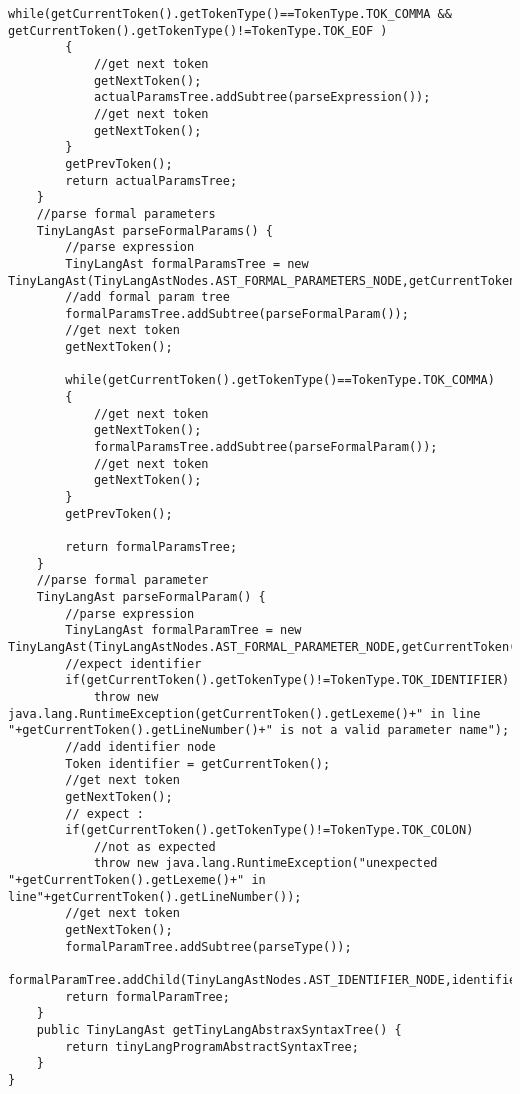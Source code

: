 \begin{lstlisting}[basicstyle=\miniscule,caption=Implementation of recursive descent parser,label=listing:rescursive descent parser implementation]
		while(getCurrentToken().getTokenType()==TokenType.TOK_COMMA && getCurrentToken().getTokenType()!=TokenType.TOK_EOF )
		{
			//get next token
			getNextToken();
			actualParamsTree.addSubtree(parseExpression());
			//get next token
			getNextToken();
		}
		getPrevToken();
		return actualParamsTree;
	}
	//parse formal parameters
	TinyLangAst parseFormalParams() {
		//parse expression
		TinyLangAst formalParamsTree = new TinyLangAst(TinyLangAstNodes.AST_FORMAL_PARAMETERS_NODE,getCurrentToken().getLineNumber());	
		//add formal param tree
		formalParamsTree.addSubtree(parseFormalParam());
		//get next token
		getNextToken();

		while(getCurrentToken().getTokenType()==TokenType.TOK_COMMA)
		{
			//get next token
			getNextToken();
			formalParamsTree.addSubtree(parseFormalParam());
			//get next token
			getNextToken();
		}
		getPrevToken();

		return formalParamsTree;
	}
	//parse formal parameter
	TinyLangAst parseFormalParam() {
		//parse expression
		TinyLangAst formalParamTree = new TinyLangAst(TinyLangAstNodes.AST_FORMAL_PARAMETER_NODE,getCurrentToken().getLineNumber());	
		//expect identifier
		if(getCurrentToken().getTokenType()!=TokenType.TOK_IDENTIFIER)
			throw new java.lang.RuntimeException(getCurrentToken().getLexeme()+" in line "+getCurrentToken().getLineNumber()+" is not a valid parameter name");
		//add identifier node
		Token identifier = getCurrentToken();
		//get next token
		getNextToken();
		// expect :
		if(getCurrentToken().getTokenType()!=TokenType.TOK_COLON)
			//not as expected
			throw new java.lang.RuntimeException("unexpected "+getCurrentToken().getLexeme()+" in line"+getCurrentToken().getLineNumber());
		//get next token
		getNextToken();
		formalParamTree.addSubtree(parseType());	
		formalParamTree.addChild(TinyLangAstNodes.AST_IDENTIFIER_NODE,identifier.getLexeme(),identifier.getLineNumber());
		return formalParamTree;
	}
	public TinyLangAst getTinyLangAbstraxSyntaxTree() {
		return tinyLangProgramAbstractSyntaxTree;
	}
}
\end{lstlisting}


